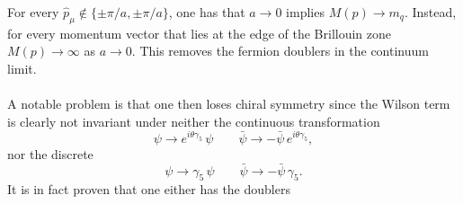 For every $\hat p_\mu \not\in \{\pm \pi/a, \pm \pi/a\}$, one has that $a \to 0$ implies $M(p) \to m_q$. Instead, for every momentum vector that lies at the edge of the Brillouin zone $M(p) \to \infty$ as $a \to 0$. This removes the fermion doublers in the continuum limit. \\~\\
A notable problem is that one then loses chiral symmetry since the Wilson term is clearly not invariant under neither the continuous transformation
\begin{equation*}
    \psi \to e^{i \theta \gamma_5} \, \psi \qquad \bar\psi \to - \bar\psi \, e^{i \theta \gamma_5},
\end{equation*}
nor the discrete
\begin{equation*}
    \psi \to \gamma_5 \, \psi \qquad \bar\psi \to - \bar\psi \, \gamma_5.
\end{equation*}
It is in fact proven that one either has the doublers \cite{NIELSEN198120}